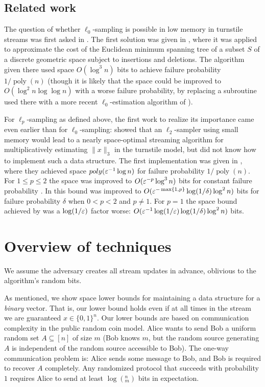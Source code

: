 \subsection{Related work}
The question of whether $\ell_0$-sampling is possible in low memory in turnstile streams was first asked in \cite{CormodeMR05}. The first solution was given in \cite{FrahlingIS08}, where it was applied to approximate the cost of the Euclidean minimum spanning tree of a subset $S$ of a discrete geometric space subject to insertions and deletions. The algorithm given there used space $O(\log^3 n)$ bits to achieve failure probability $1/\mathop{poly}(n)$ (though it is likely that the space could be improved to $O(\log^2 n\log\log n)$ with a worse failure probability, by replacing a subroutine used there with a more recent $\ell_0$-estimation algorithm of \cite{KaneNW10}).

For $\ell_p$-sampling as defined above, the first work to realize its importance came even earlier than for $\ell_0$-sampling: \cite{CoppersmithK04} showed that an $\ell_2$-sampler using small memory would lead to a nearly space-optimal streaming algorithm for multiplicatively estimating $\|x\|_3$ in the turnstile model, but did not know how to implement such a data structure. The first implementation was given in \cite{MonemizadehW10}, where they achieved space $\mathop{poly}(\varepsilon^{-1}\log n)$ for failure probability $1/\mathop{poly}(n)$. For $1\le p\le 2$ the space was improved to $O(\varepsilon^{-p}\log^3 n)$ bits for constant failure probability \cite{AndoniKO11}. In \cite{JowhariST11} this bound was improved to $O(\varepsilon^{-\max\{1,p\}}\log(1/\delta)\log^2 n)$ bits for failure probability $\delta$ when $0<p<2$ and $p\neq 1$. For $p=1$ the space bound achieved by \cite{JowhariST11} was a $\log(1/\varepsilon)$ factor worse: $O(\varepsilon^{-1}\log(1/\varepsilon)\log(1/\delta)\log^2 n)$ bits.

\section{Overview of techniques}
We assume the adversary creates all stream updates in advance, oblivious to the algorithm's random bits.

As mentioned, we show space lower bounds for maintaining a \suppfind{} data structure for a {\em binary} vector. That is, our lower bound holds even if at all times in the stream we are guaranteed $x\in \{0,1\}^n$. Our lower bounds are based on communication complexity in the public random coin model. Alice wants to send Bob a uniform random set $A\subseteq [n]$ of size $m$ (Bob knows $m$, but the random source generating $A$ is independent of the random source accessible to Bob). The one-way communication problem is: Alice sends some message to Bob, and Bob is required to recover $A$ completely. Any randomized protocol that succeeds with probability $1$ requires Alice to send at least $\log (^n_m)$ bits in expectation.

